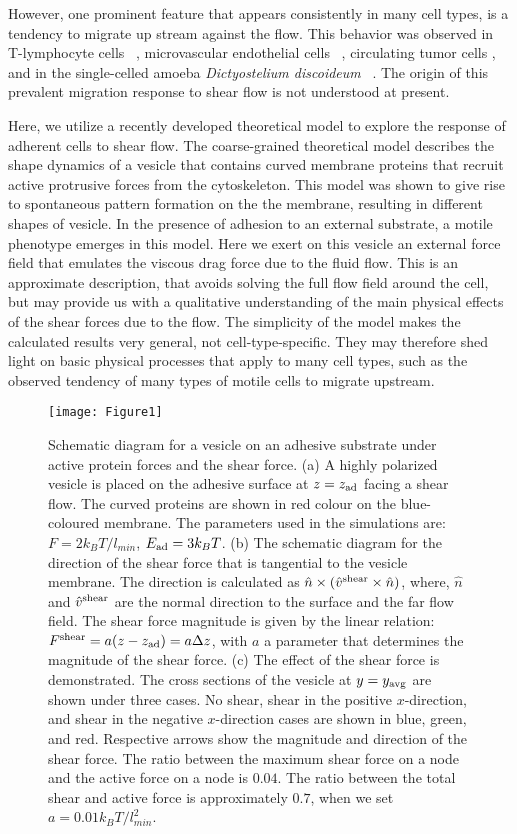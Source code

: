 \documentclass[
reprint,
superscriptaddress,
 amsmath,amssymb,
 aps,
prl,
floatfix]{revtex4-2}
\begin{document}
However, one prominent feature that appears consistently in many cell types, is a tendency to migrate up stream against the flow. This behavior was observed in T-lymphocyte cells ~\cite{steiner2010differential,Dominguez2015,Anderson2019}, microvascular endothelial cells ~\cite{Ostrowski2014,alghanem2021swell1}, circulating tumor cells \cite{follain2018hemodynamic}, and in the single-celled amoeba \emph{Dictyostelium discoideum} ~\cite{decave2003shear,Fache2005,Dalous2008}. The origin of this prevalent migration response to shear flow is not understood at present.

Here, we utilize a recently developed theoretical model to explore the response of adherent cells to shear flow. The coarse-grained theoretical model describes the shape dynamics of a vesicle that contains curved membrane proteins that recruit active protrusive forces from the cytoskeleton. This model was shown to give rise to spontaneous pattern formation on the the membrane, resulting in different shapes of vesicle. In the presence of adhesion to an external substrate, a motile phenotype emerges in this model. Here we exert on this vesicle an external force field that emulates the viscous drag force due to the fluid flow. This is an approximate description, that avoids solving the full flow field around the cell, but may provide us with a qualitative understanding of the main physical effects of the shear forces due to the flow. The simplicity of the model makes the calculated results very general, not cell-type-specific. They may therefore shed light on basic physical processes that apply to many cell types, such as the observed tendency of many types of motile cells to migrate upstream.


\begin{figure}
    \centering
    \texttt{[image: Figure1]}
    \caption{Schematic diagram for a vesicle on an adhesive substrate under active protein forces and the shear force. (a) A highly polarized vesicle is placed on the adhesive surface at $z=z_{\rm ad}$ facing a shear flow. The curved proteins are shown in red colour on the blue-coloured membrane. The parameters used in the simulations are: $F=2 k_BT/l_{min}$, $E_{\rm ad}=3 k_BT$.
    (b) The schematic diagram for the direction of the shear force that is tangential to the vesicle membrane. The direction is calculated as $\hat{n}\times(\hat{v}^{\rm shear}\times\hat{n})$, where, $\hat{n}$ and $\hat{v}^{\rm shear}$ are the normal direction to the surface and the far flow field. The shear force magnitude is given by the linear relation: $F^{\rm shear}=a(z-z_{\rm ad})=a\Delta z$, with $a$ a parameter that determines the magnitude of the shear force.
    (c) The effect of the shear force is demonstrated. The cross sections of the vesicle at $y=y_{\rm avg}$ are shown under three cases. No shear, shear in the positive $x$-direction, and shear in the negative $x$-direction cases are shown in blue, green, and red. Respective arrows show the magnitude and direction of the shear force. The ratio between the maximum shear force on a node and the active force on a node is $0.04$. The ratio between the total shear and active force is approximately $0.7$, when we set $a=0.01k_BT/l_{min}^2$.}
    \label{fig1}
\end{figure}
\end{document}
